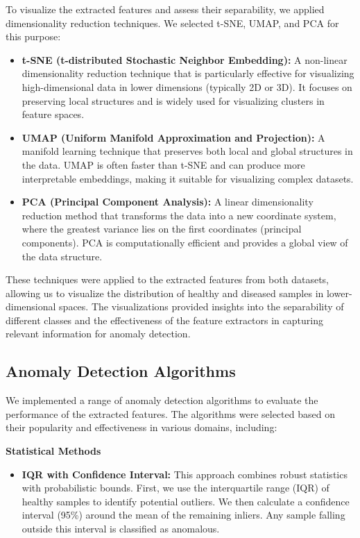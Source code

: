 \documentclass[12pt,a4paper,oneside]{report}
\begin{document}
To visualize the extracted features and assess their separability, we applied dimensionality reduction techniques. We selected t-SNE, UMAP, and PCA for this purpose:
\begin{itemize}
    \item \textbf{t-SNE (t-distributed Stochastic Neighbor Embedding):} A non-linear dimensionality reduction technique that is particularly effective for visualizing high-dimensional data in lower dimensions (typically 2D or 3D). It focuses on preserving local structures and is widely used for visualizing clusters in feature spaces.
    
    \item \textbf{UMAP (Uniform Manifold Approximation and Projection):} A manifold learning technique that preserves both local and global structures in the data. UMAP is often faster than t-SNE and can produce more interpretable embeddings, making it suitable for visualizing complex datasets.
    
    \item \textbf{PCA (Principal Component Analysis):} A linear dimensionality reduction method that transforms the data into a new coordinate system, where the greatest variance lies on the first coordinates (principal components). PCA is computationally efficient and provides a global view of the data structure.
\end{itemize}
These techniques were applied to the extracted features from both datasets, allowing us to visualize the distribution of healthy and diseased samples in lower-dimensional spaces. The visualizations provided insights into the separability of different classes and the effectiveness of the feature extractors in capturing relevant information for anomaly detection.

\subsection{Anomaly Detection Algorithms}

We implemented a range of anomaly detection algorithms to evaluate the performance of the extracted features. The algorithms were selected based on their popularity and effectiveness in various domains, including:

\textbf{Statistical Methods}

\begin{itemize}
    \item \textbf{IQR with Confidence Interval:} This approach combines robust statistics with probabilistic bounds. First, we use the interquartile range (IQR) of healthy samples to identify potential outliers. We then calculate a confidence interval (95\%) around the mean of the remaining inliers. Any sample falling outside this interval is classified as anomalous.
\end{itemize}
\end{document}
